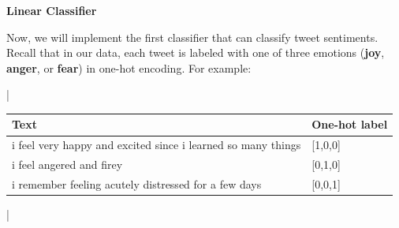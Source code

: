 \item {\bf Linear Classifier}

Now, we will implement the first classifier that can classify tweet sentiments.
Recall that in our data, each tweet is labeled with one of three emotions (\textbf{joy}, \textbf{anger}, or \textbf{fear}) in one-hot encoding. For example:

\begin{table}[h]
\centering
\lstDeleteShortInline|
\begin{tabular}{|l|l|}
\hline
\textbf{Text} & \textbf{One-hot label} \\
\hline
i feel very happy and excited since i learned so many things & [1,0,0] \\
i feel angered and firey & [0,1,0] \\
i remember feeling acutely distressed for a few days & [0,0,1] \\
\hline
\end{tabular}
\lstMakeShortInline|
\end{table}

\begin{enumerate}

  

  

  

  

  

  

  

  

\end{enumerate}
